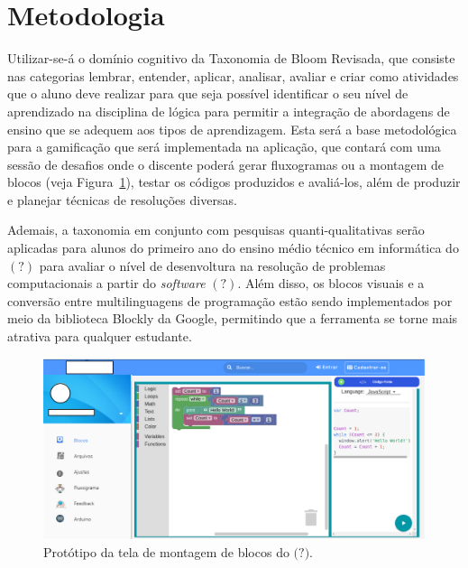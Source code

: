 \documentclass[12pt]{article}
\begin{document}
\section{Metodologia} 
Utilizar-se-á o domínio cognitivo da Taxonomia de Bloom Revisada, que consiste nas categorias lembrar, entender, aplicar, analisar, avaliar e criar \cite{ANDERSON:2001} como atividades que o aluno deve realizar para que seja possível identificar o seu nível de aprendizado na disciplina de lógica para permitir a integração de abordagens de ensino que se adequem aos tipos de aprendizagem. Esta será a base metodológica para a gamificação que será implementada na aplicação, que contará com uma sessão de desafios onde o discente poderá gerar fluxogramas ou a montagem de blocos (veja Figura~\ref{fig2}), testar os códigos produzidos e avaliá-los, além de produzir e planejar técnicas de resoluções diversas.
\par Ademais, a taxonomia em conjunto com pesquisas quanti-qualitativas serão aplicadas para alunos do primeiro ano do ensino médio técnico em informática do $(?)$ para avaliar o nível de desenvoltura na resolução de problemas computacionais a partir do \textit{software} $(?)$.
Além disso, os blocos visuais e a conversão entre multilinguagens de programação estão sendo implementados por meio da biblioteca Blockly da Google, permitindo que a ferramenta se torne mais atrativa para qualquer estudante.  

	\begin{figure}[h]
		\centering
		\includegraphics[scale=0.3]{bloc.png}
		\caption{Protótipo da tela de montagem de blocos do $\textbf{(?)}$.}
		\label{fig2}
	\end{figure}
\end{document}

